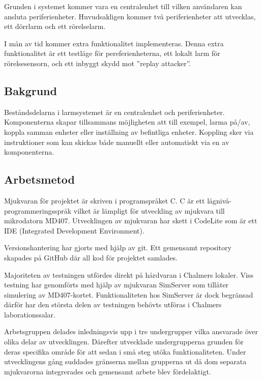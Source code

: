\documentclass[a4paper]{article}
\begin{document}
Grunden i systemet kommer vara en centralenhet till vilken användaren kan ansluta periferienheter.
Huvudsakligen kommer två periferienheter att utvecklas, ett dörrlarm och ett rörelselarm.

I mån av tid kommer extra funktionalitet implementeras.
Denna extra funktionalitet är ett testläge för pereferienheterna, ett lokalt larm för rörelsesensorn, och ett inbyggt skydd mot ''replay attacker''.

\subsection{Bakgrund}

Beståndsdelarna i larmsystemet är en centralenhet och periferienheter.
Komponenterna skapar tillsammans möjligheten att till exempel, larma på/av, koppla samman enheter eller inställning av befintliga enheter.
Koppling sker via instruktioner som kan skickas både manuellt eller automatiskt via en av komponenterna.

\subsection{Arbetsmetod}

Mjukvaran för projektet är skriven i programspråket C.
C är ett lågnivå-programmeringsspråk vilket är lämpligt för utveckling av mjukvara till mikrodatorn MD407.
Utvecklingen av mjukvaran har skett i CodeLite som är ett IDE (Integrated Development Environment).

Versionshantering har gjorts med hjälp av git.
Ett gemensamt repository skapades på GitHub där all kod för projektet samlades.

Majoriteten av testningen utfördes direkt på hårdvaran i Chalmers lokaler.
Viss testning har genomförts med hjälp av mjukvaran SimServer som tillåter simulering av MD407-kortet.
Funktionaliteten hos SimServer är dock begränsad därför har den största delen av testningen behövts utföras i Chalmers laborationssalar.

Arbetsgruppen delades inledningsvis upp i tre undergrupper vilka ansvarade över olika delar av utvecklingen.
Därefter utvecklade undergrupperna grunden för deras specifika område för att sedan i små steg utöka funktionaliteten.
Under utvecklingens gång suddades gränserna mellan grupperna ut då dom separata mjukvarorna integrerades och gemensamt arbete blev fördelaktigt.
\end{document}
